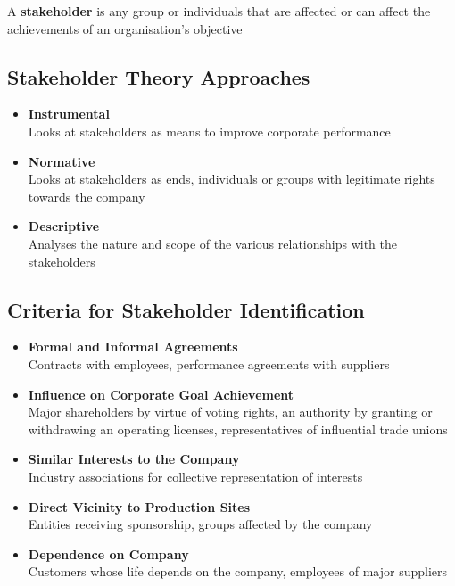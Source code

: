 \documentclass[11pt]{article}
\theoremstyle{definition}
\begin{document}
\begin{definition}
	A \textbf{stakeholder} is any group or individuals that are affected or can affect the achievements of an
	organisation's objective
\end{definition}

\subsection{Stakeholder Theory Approaches}
\begin{itemize}
	\item \textbf{Instrumental}\\
	Looks at stakeholders as means to improve corporate performance
	\item \textbf{Normative}\\
	Looks at stakeholders as ends, individuals or groups with legitimate rights towards the company
	\item \textbf{Descriptive}\\
	Analyses the nature and scope of the various relationships with the stakeholders
\end{itemize}
\parencite{donaldson1995stakeholder}

\subsection{Criteria for Stakeholder Identification}
\begin{itemize}[label=-]
	\item \textbf{Formal and Informal Agreements}\\
	Contracts with employees, performance agreements with suppliers
	\item \textbf{Influence on Corporate Goal Achievement}\\
	Major shareholders by virtue of voting rights, an authority by granting or withdrawing an operating licenses, representatives of influential trade unions
	\item \textbf{Similar Interests to the Company}\\
	Industry associations for collective representation of interests
	\item \textbf{Direct Vicinity to Production Sites}\\
	Entities receiving sponsorship, groups affected by the company
	\item \textbf{Dependence on Company}\\
	Customers whose life depends on the company, employees of major suppliers
\end{itemize}
\end{document}
